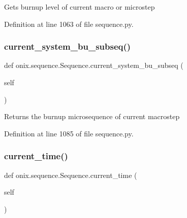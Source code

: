 \begin{DoxyVerb}Gets burnup level of current macro or microstep
\end{DoxyVerb}
 

Definition at line 1063 of file sequence.\+py.

\mbox{\label{classonix_1_1sequence_1_1Sequence_a8372ad59f11b54f4afcab9030a14918e}} 
\subsubsection{\texorpdfstring{current\+\_\+system\+\_\+bu\+\_\+subseq()}{current\_system\_bu\_subseq()}}
{\footnotesize\ttfamily def onix.\+sequence.\+Sequence.\+current\+\_\+system\+\_\+bu\+\_\+subseq (\begin{DoxyParamCaption}\item[{}]{self }\end{DoxyParamCaption})}

\begin{DoxyVerb}Returns the burnup microsequence of current macrostep
\end{DoxyVerb}
 

Definition at line 1085 of file sequence.\+py.

\mbox{\label{classonix_1_1sequence_1_1Sequence_a09111cb428953c0504a7be4f796c1091}} 
\subsubsection{\texorpdfstring{current\+\_\+time()}{current\_time()}\hspace{0.1cm}{\footnotesize\ttfamily [1/2]}}
{\footnotesize\ttfamily def onix.\+sequence.\+Sequence.\+current\+\_\+time (\begin{DoxyParamCaption}\item[{}]{self }\end{DoxyParamCaption})}



